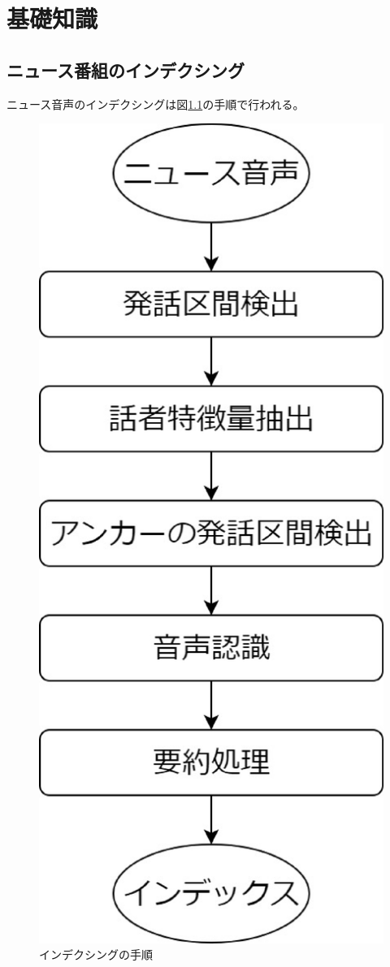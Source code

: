 \chapter{基礎知識}

\section{ニュース番組のインデクシング}
ニュース音声のインデクシングは図\ref{fig:indexing}の手順で行われる。

\begin{figure}[H]
  \begin{center}
    \includegraphics[scale=0.3]{./figure/indexing.eps}
  \end{center}
  \caption{インデクシングの手順 \label{fig:indexing}}
\end{figure}

